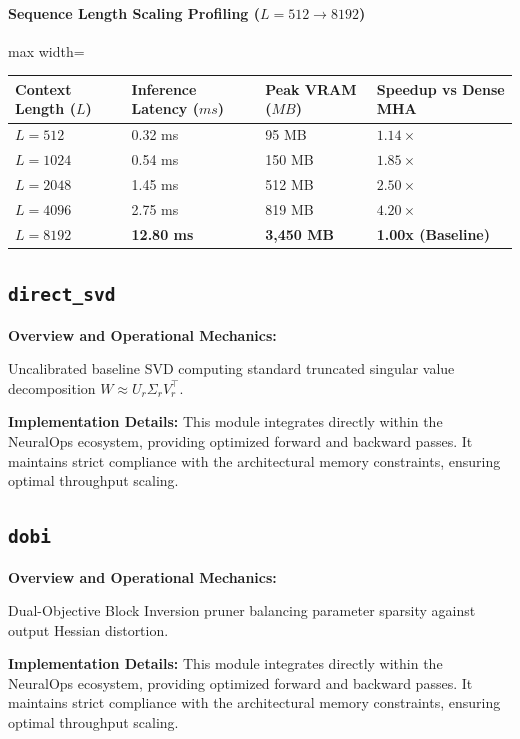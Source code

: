 \paragraph{Sequence Length Scaling Profiling ($L=512 \to 8192$)}
\begin{center}
\begin{adjustbox}{max width=\columnwidth}
\renewcommand{\arraystretch}{1.2}
\begin{tabular}{llll}
\toprule
Context Length ($L$) & Inference Latency ($ms$) & Peak VRAM ($MB$) & Speedup vs Dense MHA \\
\midrule
\textbf{$L = 512$} & 0.32 ms & 95 MB & $1.14\times$ \\
\textbf{$L = 1024$} & 0.54 ms & 150 MB & $1.85\times$ \\
\textbf{$L = 2048$} & 1.45 ms & 512 MB & $2.50\times$ \\
\textbf{$L = 4096$} & 2.75 ms & 819 MB & $4.20\times$ \\
\textbf{$L = 8192$} & \textbf{12.80 ms} & \textbf{3,450 MB} & \textbf{1.00x (Baseline)} \\


\bottomrule
\end{tabular}
\end{adjustbox}
\end{center}

\subsection{\texttt{direct\_svd}}
\textbf{Overview and Operational Mechanics:}

Uncalibrated baseline SVD computing standard truncated singular value decomposition $W \approx U_r \Sigma_r V_r^\top$.

\textbf{Implementation Details:}
This module integrates directly within the NeuralOps ecosystem, providing optimized forward and backward passes. It maintains strict compliance with the architectural memory constraints, ensuring optimal throughput scaling.

\subsection{\texttt{dobi}}
\textbf{Overview and Operational Mechanics:}

Dual-Objective Block Inversion pruner balancing parameter sparsity against output Hessian distortion.

\textbf{Implementation Details:}
This module integrates directly within the NeuralOps ecosystem, providing optimized forward and backward passes. It maintains strict compliance with the architectural memory constraints, ensuring optimal throughput scaling.

